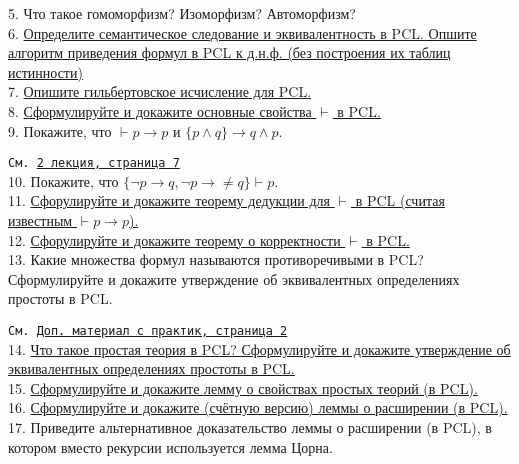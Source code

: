 \documentclass[a4paper,100pt]{article}
\theoremstyle{indented}
\theoremstyle{definition}
\theoremstyle{remark}
\DeclareMathOperator{\ra}{\rightarrow}
\begin{document}
5. %
{Что такое гомоморфизм? Изоморфизм? Автоморфизм?} \\

6. \hyperlink{b6}{Определите семантическое следование и эквивалентность в PCL. Опшите алгоритм приведения формул в PCL к д.н.ф. (без построения их таблиц истинности)} \\ 

7. \hyperlink{b7}{Опишите гильбертовское исчисление для PCL.} \\

8. \hyperlink{b8}{Сформулируйте и докажите основные свойства $\vdash$ в PCL.} \\

9. %
{Покажите, что $\vdash p \ra p$ и $\{p\wedge q\}\ra q \wedge p$.} \

\texttt{См. \href{http://www.mi-ras.ru/~speranski/courses/logic-1-2021-spring/slides_2.pdf}{2 лекция, страница 7}}\\

10. %
{Покажите, что $\{\neg p \ra q, \neg p \ra \neq q\} \vdash p$.} \\

11. \hyperlink{b11}{Сфорулируйте и докажите теорему дедукции для $\vdash$ в PCL (считая известным $\vdash p \ra p$).} \\

12. \hyperlink{b12}{Сфорулируйте и докажите теорему о корректности $\vdash$ в PCL.} \\

13. %
{Какие множества формул называются противоречивыми в PCL? Сформулируйте и докажите утверждение об эквивалентных определениях простоты в PCL.} \

\texttt{См. \href{http://www.mi-ras.ru/~speranski/courses/logic-1-2021-spring/slides-more_pcl.pdf}{Доп. материал с практик, страница 2}} \\

14. \hyperlink{b14}{Что такое простая теория в PCL? Сформулируйте и докажите утверждение об эквивалентных определениях простоты в PCL.} \\

15. \hyperlink{b15}{Сформулируйте и докажите лемму о свойствах простых теорий (в PCL).} \\

16. \hyperlink{b16}{Сформулируйте и докажите (счётную версию) леммы о расширении (в PCL).} \\

17. %
{Приведите альтернативное доказательство леммы о расширении (в PCL), в котором вместо рекурсии используется лемма Цорна.} \ 
\end{document}
